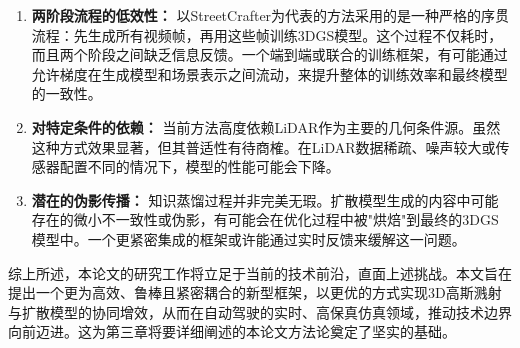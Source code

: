 \begin{enumerate}
\item \textbf{两阶段流程的低效性：} 以StreetCrafter为代表的方法采用的是一种严格的序贯流程：先生成所有视频帧，再用这些帧训练3DGS模型。这个过程不仅耗时，而且两个阶段之间缺乏信息反馈。一个端到端或联合的训练框架，有可能通过允许梯度在生成模型和场景表示之间流动，来提升整体的训练效率和最终模型的一致性。

\item \textbf{对特定条件的依赖：} 当前方法高度依赖LiDAR作为主要的几何条件源。虽然这种方式效果显著，但其普适性有待商榷。在LiDAR数据稀疏、噪声较大或传感器配置不同的情况下，模型的性能可能会下降。

\item \textbf{潜在的伪影传播：} 知识蒸馏过程并非完美无瑕。扩散模型生成的内容中可能存在的微小不一致性或伪影，有可能会在优化过程中被"烘焙"到最终的3DGS模型中。一个更紧密集成的框架或许能通过实时反馈来缓解这一问题。
\end{enumerate}

综上所述，本论文的研究工作将立足于当前的技术前沿，直面上述挑战。本文旨在提出一个更为高效、鲁棒且紧密耦合的新型框架，以更优的方式实现3D高斯溅射与扩散模型的协同增效，从而在自动驾驶的实时、高保真仿真领域，推动技术边界向前迈进。这为第三章将要详细阐述的本论文方法论奠定了坚实的基础。
